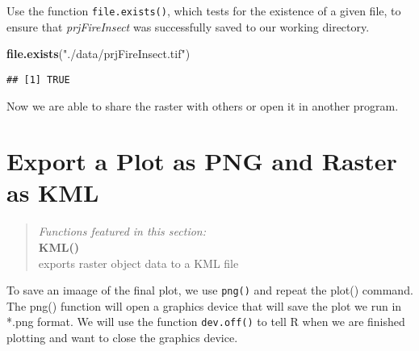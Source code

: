\documentclass[
]{article}
\newenvironment{Shaded}{\begin{snugshade}}{\end{snugshade}}
\newcommand{\FunctionTok}[1]{\textcolor[rgb]{0.13,0.29,0.53}{\textbf{#1}}}
\newcommand{\NormalTok}[1]{#1}
\newcommand{\StringTok}[1]{\textcolor[rgb]{0.31,0.60,0.02}{#1}}
\begin{document}
Use the function \texttt{file.exists()}, which tests for the existence
of a given file, to ensure that \emph{prjFireInsect} was successfully
saved to our working directory.

\begin{Shaded}
\begin{Highlighting}[]
\FunctionTok{file.exists}\NormalTok{(}\StringTok{"./data/prjFireInsect.tif"}\NormalTok{) }
\end{Highlighting}
\end{Shaded}

\begin{verbatim}
## [1] TRUE
\end{verbatim}

Now we are able to share the raster with others or open it in another
program.

\hypertarget{export-a-plot-as-png-and-raster-as-kml}{%
\section{Export a Plot as PNG and Raster as
KML}\label{export-a-plot-as-png-and-raster-as-kml}}

\begin{quote}
\emph{Functions featured in this section:}\\
\textbf{KML()}\\
exports raster object data to a KML file
\end{quote}

To save an imaage of the final plot, we use \texttt{png()} and repeat
the plot() command. The png() function will open a graphics device that
will save the plot we run in *.png format. We will use the function
\texttt{dev.off()} to tell R when we are finished plotting and want to
close the graphics device.
\end{document}
